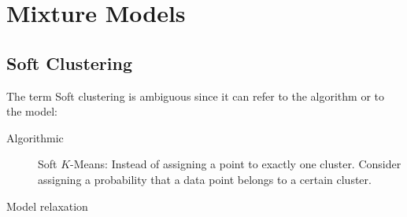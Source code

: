 \section{Mixture Models}
\subsection{Soft Clustering}
The term Soft clustering is ambiguous since it can refer to the algorithm or to the model:
\begin{description}
\item[Algorithmic] Soft $K$-Means: Instead of assigning a point to exactly one cluster. Consider assigning a probability that a data point belongs to a certain cluster. 
\item[Model relaxation]
\end{description}
